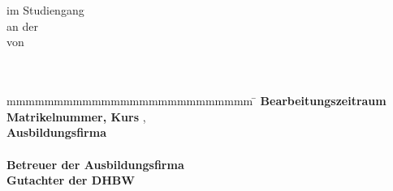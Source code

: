 
\begin{titlepage}
    \begin{minipage}{6in}
        \centering
        \hspace*{4cm}
    \end{minipage}
    \enlargethispage{20mm}
    \begin{center}
        \vspace*{12mm}	{\LARGE\textbf {} }\\
        \vspace*{12mm}	{\large\textbf {}}\\
        \vspace*{12mm}	im Studiengang \\
    \vspace*{3mm}		an der \\
        \vspace*{12mm}  von\\
        \vspace*{3mm}   {\large\textbf{}}\\
        \vspace*{12mm}  \\
    \end{center}
    \vfill
    \begin{spacing}{1.2}
    \begin{tabbing}
        mmmmmmmmmmmmmmmmmmmmmmmmmm    \= \kill
        \textbf{Bearbeitungszeitraum}                      \> \\
        \textbf{Matrikelnummer, Kurs}                      \> , \\
        \textbf{Ausbildungsfirma}                          \> \\
                                                           \> \\
        \textbf{Betreuer der Ausbildungsfirma}             \> \\
        \ifdefined{}\textbf{Gutachter der DHBW} \> \\\fi
    \end{tabbing}
    \end{spacing}
    \vspace*{15mm}
\end{titlepage}
